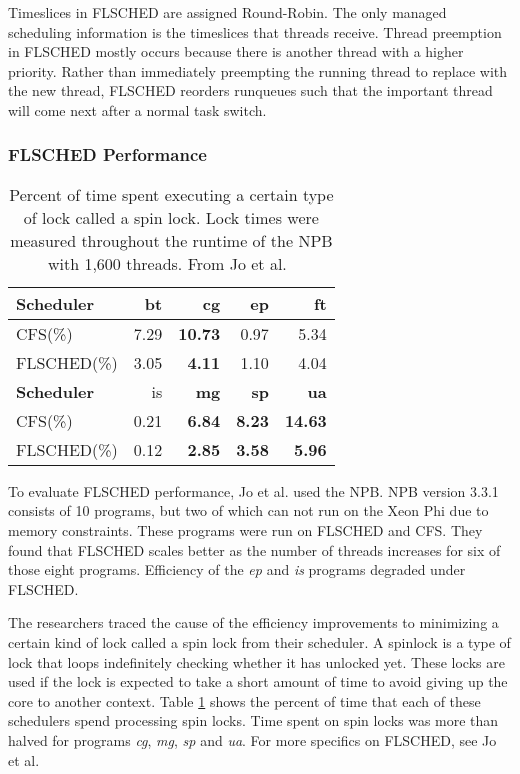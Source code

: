 \documentclass{sig-alternate}
\begin{document}
Timeslices in FLSCHED are assigned Round-Robin. The only managed scheduling information is the timeslices that threads receive. Thread preemption in FLSCHED mostly occurs because there is another thread with a higher priority. Rather than immediately preempting the running thread to replace with the new thread, FLSCHED reorders runqueues such that the important thread will come next after a normal task switch.~\cite{Jo:2017}


\subsubsection{FLSCHED Performance}
\label{sec:flsched_performance}


\begin{table}
	\begin{center}
	\begin{tabular}{ l | r | r | r | r }
		\textbf{Scheduler} & bt & \textbf{cg} & ep & ft \\ \hline
		CFS(\%) & 7.29 & \textbf{10.73} & 0.97 & 5.34 \\
		FLSCHED(\%) & 3.05 & \textbf{4.11} & 1.10 & 4.04
		\vspace{0.2cm}
		 \\ %
		\textbf{Scheduler} & is & \textbf{mg} & \textbf{sp} & \textbf{ua} \\ \hline
		CFS(\%) & 0.21 & \textbf{6.84} & \textbf{8.23} & \textbf{14.63} \\
		FLSCHED(\%) & 0.12 & \textbf{2.85} & \textbf{3.58} & \textbf{5.96} \\ %
	\end{tabular}
\end{center}
	\caption{ Percent of time spent executing a certain type of lock called a spin lock. Lock times were measured throughout the runtime of the NPB with 1,600 threads. From Jo et al.~\cite{Jo:2017}}
	\label{fig:flsched_spinlock}
\end{table}

To evaluate FLSCHED performance, Jo et al. used the NPB. NPB version 3.3.1 consists of 10 programs, but two of which can not run on the Xeon Phi due to memory constraints. These programs were run on FLSCHED and CFS. They found that FLSCHED scales better as the number of threads increases for six of those eight programs. Efficiency of the \textit{ep} and \textit{is} programs degraded under FLSCHED.~\cite{Jo:2017}

The researchers traced the cause of the efficiency improvements to minimizing a certain kind of lock called a spin lock from their scheduler. A spinlock is a type of lock that loops indefinitely checking whether it has unlocked yet. These locks are used if the lock is expected to take a short amount of time to avoid giving up the core to another context. Table \ref{fig:flsched_spinlock} shows the percent of time that each of these schedulers spend processing spin locks. Time spent on spin locks was more than halved for programs \textit{cg}, \textit{mg}, \textit{sp} and \textit{ua}. For more specifics on FLSCHED, see Jo et al.~\cite{Jo:2017}
\end{document}
